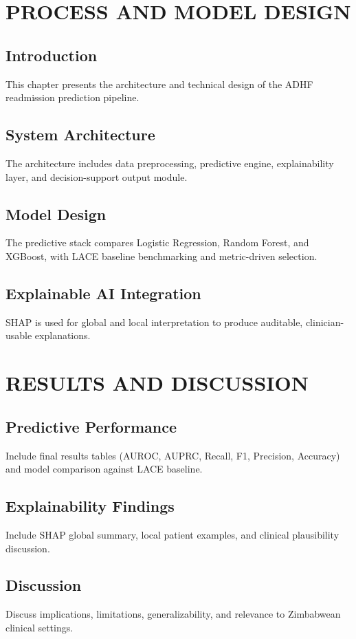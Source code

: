 \documentclass[12pt,a4paper]{report}
\begin{document}
\chapter{PROCESS AND MODEL DESIGN}
\section{Introduction}
This chapter presents the architecture and technical design of the ADHF readmission prediction pipeline.

\section{System Architecture}
The architecture includes data preprocessing, predictive engine, explainability layer, and decision-support output module.

\section{Model Design}
The predictive stack compares Logistic Regression, Random Forest, and XGBoost, with LACE baseline benchmarking and metric-driven selection.

\section{Explainable AI Integration}
SHAP is used for global and local interpretation to produce auditable, clinician-usable explanations.

\chapter{RESULTS AND DISCUSSION}
\section{Predictive Performance}
Include final results tables (AUROC, AUPRC, Recall, F1, Precision, Accuracy) and model comparison against LACE baseline.

\section{Explainability Findings}
Include SHAP global summary, local patient examples, and clinical plausibility discussion.

\section{Discussion}
Discuss implications, limitations, generalizability, and relevance to Zimbabwean clinical settings.
\end{document}
